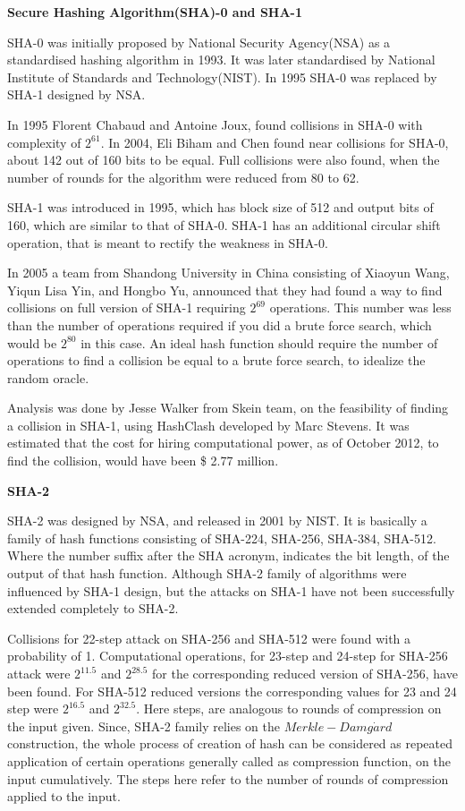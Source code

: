 \documentclass[12pt]{artikel3}                  %
\begin{document}
  {\bf Secure Hashing Algorithm(SHA)-0 and SHA-1}

  SHA-0 was initially proposed by National Security Agency(NSA) as a standardised hashing algorithm
  in 1993. It was later standardised by National Institute of Standards and Technology(NIST). In 
  1995 SHA-0 was replaced by SHA-1 designed by NSA. \cite{00006, 00007}

  In 1995 Florent Chabaud and Antoine Joux, found collisions in SHA-0 with complexity of $2^{61}$. In
  2004, Eli Biham and Chen found near collisions for SHA-0, about 142 out of 160 bits to be equal. Full
  collisions were also found, when the number of rounds for the algorithm were reduced from 80 to 62.

  SHA-1 was introduced in 1995, which has block size of 512 and output bits of 160, which are similar
  to that of SHA-0. SHA-1 has an additional circular shift operation, that is meant to rectify the 
  weakness in SHA-0.

  In 2005 a team from Shandong University in China consisting of Xiaoyun Wang, Yiqun Lisa Yin, 
  and Hongbo Yu, announced that they had found a way to find collisions on full version of SHA-1 
  requiring $2^{69}$ operations. This number was less than the number of operations required if you
  did a brute force search, which would be $2^{80}$ in this case.\cite{00010} An ideal hash function 
  should require the number of operations to find a collision be equal to a brute force search, to 
  idealize the random oracle. 

  Analysis was done by Jesse Walker from Skein team, on the feasibility of finding a collision in 
  SHA-1, using HashClash developed by Marc Stevens. It was estimated that the cost for hiring 
  computational power, as of October 2012, to find the collision, would have been \$ 2.77 million.
  \cite{00008}

  {\bf SHA-2}

  SHA-2 was designed by NSA, and released in 2001 by NIST. It is basically a family of hash functions 
  consisting of SHA-224, SHA-256, SHA-384, SHA-512. Where the number suffix after the SHA acronym, 
  indicates the bit length, of the output of that hash function. Although SHA-2 family of algorithms
  were influenced by SHA-1 design, but the attacks on SHA-1 have not been successfully extended completely
  to SHA-2.

  Collisions for 22-step attack on SHA-256 and SHA-512 were found with a probability of 1. Computational
  operations, for 23-step and 24-step for SHA-256 attack were $2^{11.5}$ and $2^{28.5}$ for the corresponding
  reduced version of SHA-256, have been found. For SHA-512 reduced versions the corresponding values for
  23 and 24 step were $2^{16.5}$ and $2^{32.5}$.\cite{00012} Here steps, are analogous to rounds of compression
  on the input given. Since, SHA-2 family relies on the $Merkle-Damg\dot{a}rd$ construction, the whole
  process of creation of hash can be considered as repeated application of certain operations generally called
  as compression function, on the input cumulatively. The steps here refer to the number of rounds of
  compression applied to the input.
  
\end{document}
